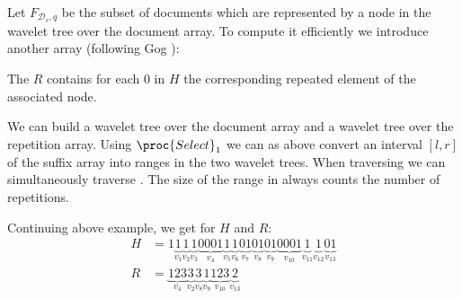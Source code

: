 Let $F_{\mathcal{D}_v, q}$ be the subset of documents which are represented by a node in the wavelet tree over the document array. To compute it efficiently we introduce another array (following Gog \cite{Gog2014}):

\begin{Definition}
  The  $R$ contains for each $0$ in $H$ the corresponding repeated element of the associated node.
\end{Definition}

We can build a wavelet tree  over the document array and a wavelet tree  over the repetition array. Using $\proc{Select}_1$ we can as above convert an interval $[l,r]$ of the suffix array into ranges in the two wavelet trees. When traversing  we can simultaneously traverse . The size of the range in  always counts the number of repetitions.

\begin{Example}
  Continuing above example, we get for $H$ and $R$:
  \begin{align*}
    H &= 1
    \underbrace{1}_{v_1}
    \underbrace{1}_{v_2}
    \underbrace{1}_{v_3}
    \underbrace{0001}_{v_4}
    \underbrace{1}_{v_5}
    \underbrace{1}_{v_6}
    \underbrace{01}_{v_7}
    \underbrace{01}_{v_8}
    \underbrace{01}_{v_9}
    \underbrace{0001}_{v_{10}}
    \underbrace{1}_{v_{11}}
    \underbrace{1}_{v_{12}}
    \underbrace{01}_{v_{13}} \\
    R &=
    \underbrace{123}_{v_4}
    \underbrace{3}_{v_2}
    \underbrace{3}_{v_8}
    \underbrace{1}_{v_9}
    \underbrace{123}_{v_{10}}
    \underbrace{2}_{v_{13}}
  \end{align*}
\end{Example}
